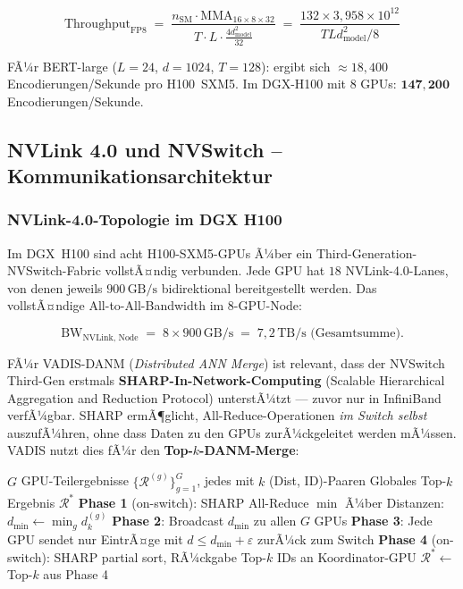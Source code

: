 ﻿\documentclass[12pt,a4paper]{article}
\begin{document}
\begin{equation}
  \text{Throughput}_{\text{FP8}} \;=\;
  \frac{n_{\text{SM}} \cdot \text{MMA}_{16 \times 8 \times 32}}
       {T \cdot L \cdot \frac{4 d_{\text{model}}^2}{32}}
  \;=\; \frac{132 \times 3{,}958 \times 10^{12}}{T L d_{\text{model}}^2 / 8}
\end{equation}

FÃ¼r BERT-large ($L=24$, $d=1024$, $T=128$): ergibt sich
$\approx 18{,}400$ Encodierungen/Se\-kun\-de pro H100~SXM5.
Im DGX-H100 mit 8 GPUs: $\mathbf{147{,}200}$ Encodierungen/Sekunde.

\subsection{NVLink 4.0 und NVSwitch -- Kommunikationsarchitektur}
\label{sub:nvlink4}

\subsubsection{NVLink-4.0-Topologie im DGX H100}

Im DGX~H100 sind acht H100-SXM5-GPUs Ã¼ber ein
Third-Generation-NVSwitch-Fabric vollstÃ¤ndig verbunden.
Jede GPU hat $18$ NVLink-4.0-Lanes, von denen jeweils
$900\,\text{GB/s}$ bidirektional bereitgestellt werden.
Das vollstÃ¤ndige All-to-All-Bandwidth im 8-GPU-Node:

\begin{equation}
  \text{BW}_{\text{NVLink, Node}} \;=\; 8 \times 900\,\text{GB/s}
  \;=\; 7{,}2\,\text{TB/s (Gesamtsumme).}
\end{equation}

FÃ¼r VADIS-DANM (\textit{Distributed ANN Merge}) ist relevant,
dass der NVSwitch Third-Gen erstmals
\textbf{SHARP-In-Network-Computing} (Scalable Hierarchical
Aggregation and Reduction Protocol) unterstÃ¼tzt ---
zuvor nur in InfiniBand verfÃ¼gbar. SHARP ermÃ¶glicht,
All-Reduce-Operationen \emph{im Switch selbst} auszufÃ¼hren,
ohne dass Daten zu den GPUs zurÃ¼ckgeleitet werden mÃ¼ssen.
VADIS nutzt dies fÃ¼r den \textbf{Top-$k$-DANM-Merge}:

\begin{algorithm}[ht]
\small
\caption{SHARP-beschleunigter DANM-Merge im DGX H100}
\label{alg:sharp_merge}
\begin{algorithmic}[1]
\Require $G$ GPU-Teilergebnisse $\{\mathcal{R}^{(g)}\}_{g=1}^G$,
         jedes mit $k$ (Dist, ID)-Paaren
\Ensure Globales Top-$k$ Ergebnis $\mathcal{R}^*$
\State \textbf{Phase 1} (on-switch): SHARP All-Reduce $\min$ Ã¼ber
       Distanzen: $d_{\min} \gets \min_g d_k^{(g)}$
\State \textbf{Phase 2}: Broadcast $d_{\min}$ zu allen $G$ GPUs
\State \textbf{Phase 3}: Jede GPU sendet nur EintrÃ¤ge mit
       $d \leq d_{\min} + \varepsilon$ zurÃ¼ck zum Switch
\State \textbf{Phase 4} (on-switch): SHARP partial sort,
       RÃ¼ckgabe Top-$k$ IDs an Koordinator-GPU
\State \Return $\mathcal{R}^* \gets$ Top-$k$ aus Phase 4
\end{algorithmic}
\end{algorithm}
\end{document}
